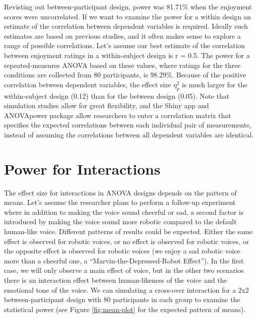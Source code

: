 \documentclass[,jou, draftfirst, a4paper,floatsintext]{apa6}
\begin{document}
Revisting out between-participant design, power was 81.71\% when the enjoyment scores were uncorrelated.
If we want to examine the power for a within design an estimate of the correlation between dependent variables is required.
Ideally such estimates are based on previous studies, and it often makes sense to explore a range of possible correlations.
Let's assume our best estimate of the correlation between enjoyment ratings in a within-subject design is r = 0.5.
The power for a repeated-measures ANOVA based on these values, where ratings for the three conditions are collected from 80 participants, is 98.29\%.
Because of the positive correlation between dependent variables, the effect size \(\eta_p^2\) is much larger for the within-subject design (0.12) than for the between design (0.05).
Note that simulation studies allow for great flexibility, and the Shiny app and ANOVApower package allow researchers to enter a correlation matrix that specifies the expected correlations between each individual pair of measurements, instead of assuming the correlations between all dependent variables are identical.

\hypertarget{power-for-interactions}{%
\section{Power for Interactions}\label{power-for-interactions}}

The effect size for interactions in ANOVA designs depends on the pattern of means.
Let's assume the researcher plans to perform a follow-up experiment where in addition to making the voice sound cheerful or sad, a second factor is introduced by making the voice sound more robotic compared to the default human-like voice.
Different patterns of results could be expected.
Either the same effect is observed for robotic voices, or no effect is observed for robotic voices, or the opposite effect is observed for robotic voices (we enjoy a sad robotic voice more than a cheerful one, a \enquote{Marvin-the-Depressed-Robot Effect}).
In the first case, we will only observe a main effect of voice, but in the other two scenarios there is an interaction effect between human-likeness of the voice and the emotional tone of the voice.
We can simulating a cross-over interaction for a 2x2 between-participant design with 80 participants in each group to examine the statistical power (see Figure \ref{fig:mean-plot} for the expected pattern of means).
\end{document}
